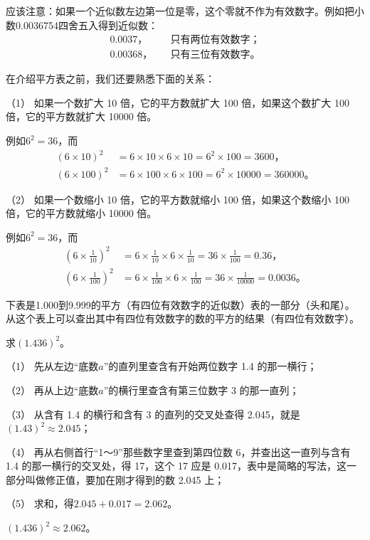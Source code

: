 应该注意：如果一个近似数左边第一位是零，这个零就不作为有效数字。例如把小数0.0036754四舍五入得到近似数：
\begin{align*}
0.0037， &\quad \text{只有两位有效数字；} \\
0.00368， &\quad \text{只有三位有效数字。}
\end{align*}

在介绍平方表之前，我们还要熟悉下面的关系：

（1） 如果一个数扩大 10 倍，它的平方数就扩大 100 倍，如果这个数扩大 100 倍，它的平方数就扩大 10000 倍。

例如\(6^2 = 36\)，而
\begin{align*}
(6 \times 10)^2 &= 6 \times 10 \times 6 \times 10 = 6^2 \times 100 = 3600， \\
(6 \times 100)^2 &= 6 \times 100 \times 6 \times 100 = 6^2 \times 10000 = 360000。
\end{align*}

（2） 如果一个数缩小 10 倍，它的平方数就缩小 100 倍，如果这个数缩小 100 倍，它的平方数就缩小 10000 倍。

例如\(6^2 = 36\)，而
\begin{align*}
\left(6 \times \frac{1}{10}\right)^2 &= 6 \times \frac{1}{10} \times 6 \times \frac{1}{10} = 36 \times \frac{1}{100} = 0.36， \\
\left(6 \times \frac{1}{100}\right)^2 &= 6 \times \frac{1}{100} \times 6 \times \frac{1}{100} = 36 \times \frac{1}{10000} = 0.0036。
\end{align*}

下表是1.000到9.999的平方（有四位有效数字的近似数）表的一部分（头和尾）。从这个表上可以查出其中有四位有效数字的数的平方的结果（有四位有效数字）。

 求\((1.436)^2\)。

 （1） 先从左边“底数$a$”的直列里查含有开始两位数字 1.4 的那一横行；

（2） 再从上边“底数$a$”的横行里查含有第三位数字 3 的那一直列；

（3） 从含有 1.4 的横行和含有 3 的直列的交叉处查得 2.045，就是\((1.43)^2 \approx 2.045\)；

（4） 再从右侧首行“1～9”那些数字里查到第四位数 6，并查出这一直列与含有 1.4 的那一横行的交叉处，得 17，这个 17 应是 0.017，表中是简略的写法，这一部分叫做修正值，要加在刚才得到的数 2.045 上；

（5） 求和，得\(2.045 + 0.017 = 2.062\)。

 \((1.436)^2 \approx 2.062\)。

